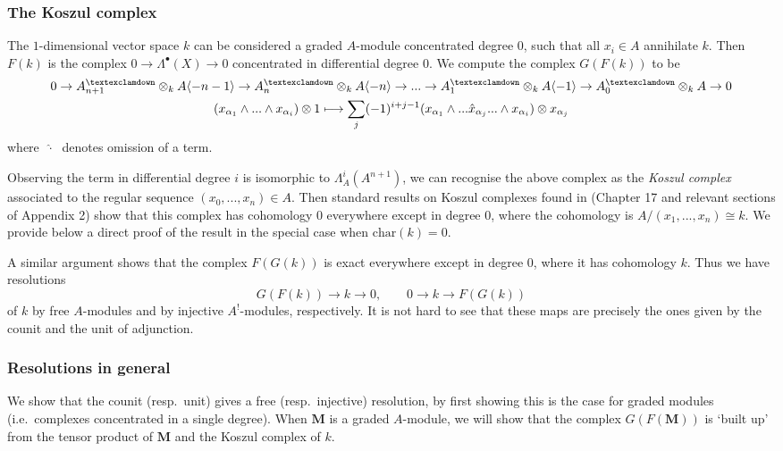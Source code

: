 \documentclass[a4paper]{article}
\theoremstyle{definition}
\theoremstyle{remark}
\newcommand{\gnab}{{\textexclamdown}}
\begin{document}
\subsubsection{The Koszul complex} 
The \(1\)-dimensional vector space \(k\) can be considered a graded \(A\)-module
concentrated degree \(0\), such that all \(x_i\in A\) annihilate \(k\). Then
\(F(k)\) is the complex \(0\rightarrow \Lambda^\bullet(X) \rightarrow 0\)
concentrated in differential degree \(0\). We compute the complex \(G(F(k))\) to
be 
\begin{gather} 
    0\rightarrow A^\gnab_{n+1}\otimes_k A\langle-n-1\rangle \rightarrow
    A^\gnab_n \otimes_k A\langle -n \rangle \rightarrow ... \rightarrow
    A^\gnab_1\otimes_k A\langle-1\rangle \rightarrow A^\gnab_0\otimes_k  A
    \rightarrow 0 \label{k-koszulcomplex} \\ 
    (x_{\alpha_1}\wedge...\wedge x_{\alpha_i})\otimes 1 \longmapsto
    \sum_{j}(-1)^{i+j-1} (x_{\alpha_1}\wedge ... \hat{x}_{\alpha_j} ... \wedge
    x_{\alpha_i}) \otimes x_{\alpha_j} \nonumber 
\end{gather} 
where \(\;\hat{\cdot}\;\) denotes omission of a term. 

Observing the term in differential degree \(i\) is isomorphic to
\(\Lambda^i_A (A^{n+1})\), we can recognise the above complex as the
\textit{Koszul complex} associated to the regular sequence
\((x_0,...,x_n)\in A\). Then standard results on Koszul complexes found in
 (Chapter 17 and relevant sections of
Appendix 2) show that this complex has cohomology \(0\) everywhere except in
degree \(0\), where the cohomology is \(A/(x_1,...,x_n)\cong k\). We provide
below a direct proof of the result in the special case when
\(\text{char}(k)=0\).


A similar argument shows that the complex \(F(G(k))\) is exact everywhere except
in degree \(0\), where it has cohomology \(k\). Thus we have resolutions  
\[G(F(k))\rightarrow k\rightarrow 0, \qquad 0\rightarrow k\rightarrow F(G(k))\] 
of \(k\) by free \(A\)-modules and by injective \(A^!\)-modules, respectively.
It is not hard to see that these maps are precisely the ones given by the counit
and the unit of adjunction. 

\subsubsection{Resolutions in general} 
We show that the counit (resp.\ unit) gives a free (resp.\ injective)
resolution, by first showing this is the case for graded modules (i.e.\
complexes concentrated in a single degree). When \(\mathbf{M}\) is a graded
\(A\)-module, we will show that the complex \(G(F(\mathbf{M}))\) is `built up'
from the tensor product of \(\mathbf{M}\) and the Koszul complex of \(k\). 
\end{document}
